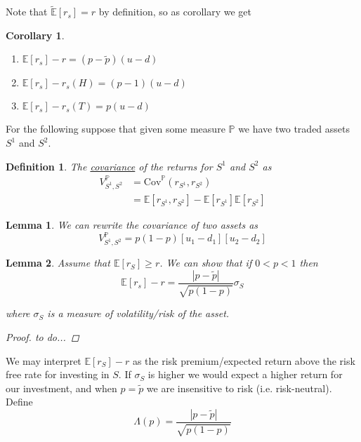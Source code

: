 \documentclass[12pt]{article}
\newtheorem{definition}{Definition}
\newtheorem{lemma}{Lemma}
\newtheorem{corollary}{Corollary}
\newlength\tindent
\renewcommand{\indent}{\hspace*{\tindent}}
\renewcommand{\P}{\mathbb P}
\newcommand{\E}{\mathbb E}
\begin{document}
Note that $\tilde{\E}[r_s] = r$ by definition, so as corollary we get
\begin{corollary} \hfill\\
\begin{enumerate}
	\item $\E[r_s] - r = (p - \tilde{p})(u - d)$ 
	\item $\E[r_s] - r_s(H) = (p - 1)(u - d)$
	\item $\E[r_s] - r_s(T) = p(u - d)$
\end{enumerate}
\end{corollary}

For the following suppose that given some measure $\P$ we have two traded assets $S^1$ and $S^2$.

\begin{definition} The \underline{covariance} of the returns for $S^1$ and $S^2$ as
\begin{align*}
	V^\P_{S^1, S^2} &= \text{Cov}^\P (r_{S^1}, r_{S^2}) \\
	&= \E[r_{S^1}, r_{S^2}] - \E[r_{S^1}]\E[r_{S^2}]
\end{align*}
\end{definition}

\begin{lemma} We can rewrite the covariance of two assets as
\begin{equation*}
	V^\P_{S^1, S^2} = p(1 - p)[u_1 - d_1][u_2 - d_2]
\end{equation*}
\end{lemma}

\begin{lemma} Assume that $\E[r_S] \geq r$. We can show that if $0 < p < 1$ then
\begin{equation*}
	\E[r_s] - r = \frac{ | p - \tilde{p} | }{\sqrt{p(1 - p)}}\sigma_S
\end{equation*}

where $\sigma_S$ is a measure of volatility/risk of the asset.
\begin{proof} to do...
\end{proof}
\end{lemma}

\indent We may interpret $\E[r_S] - r$ as the risk premium/expected return above the risk free rate for investing in $S$. If $\sigma_S$ is higher we would expect a higher return for our investment, and when $p = \tilde{p}$ we are insensitive to risk (i.e. risk-neutral). Define
\begin{equation*}
	\Lambda(p) = \frac{ |p - \tilde{p}| }{\sqrt{p(1 - p)}}
\end{equation*}
\end{document}
